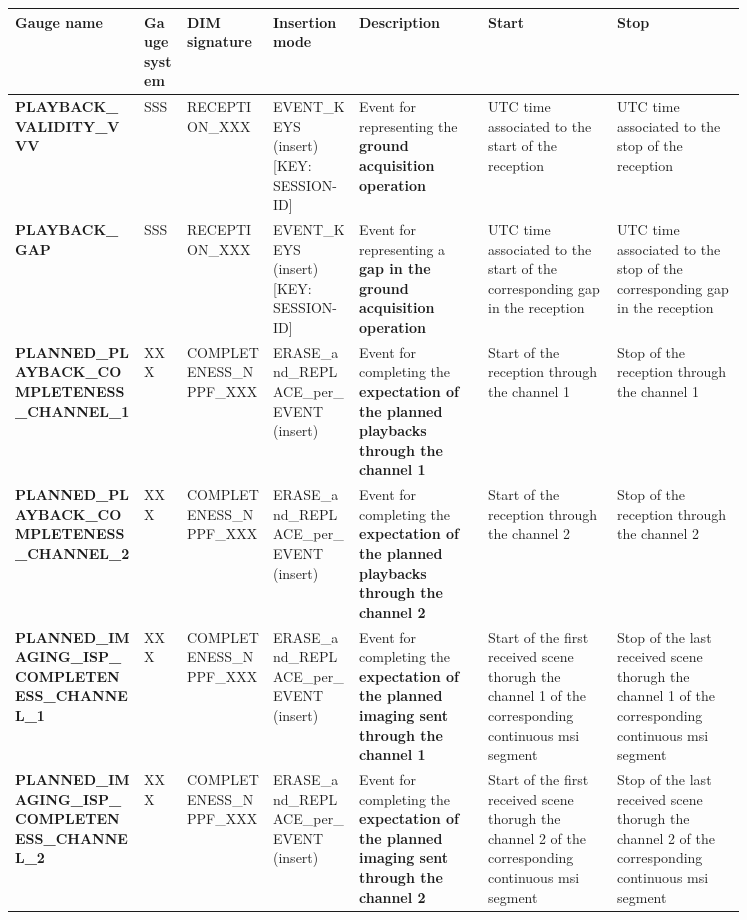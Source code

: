 \begin{landscape}
\begin{longtable}{|M{0.15\linewidth}|M{0.05\linewidth}|M{0.10\linewidth}|M{0.10\linewidth}|M{0.15\linewidth}|M{0.15\linewidth}|M{0.15\linewidth}|}
\hline \textbf{Gauge name} & \textbf{Gauge system} & \textbf{DIM signature} & \textbf{Insertion mode} & \textbf{Description} & \textbf{Start} & \textbf{Stop} \\ \hline
\textbf{PLAYBACK\_VALIDITY\_VVV} & SSS & \- RECEPTION\_XXX & EVENT\_KEYS (insert) [KEY: SESSION-ID] & Event for representing the \textbf{ground acquisition operation} & UTC time associated to the start of the reception & UTC time associated to the stop of the reception \\ \hline
\textbf{PLAYBACK\_GAP} & SSS & \- RECEPTION\_XXX & EVENT\_KEYS (insert) [KEY: SESSION-ID] & Event for representing a \textbf{gap in the ground acquisition operation} & UTC time associated to the start of the corresponding gap in the reception & UTC time associated to the stop of the corresponding gap in the reception \\ \hline
\textbf{PLANNED\_PLAYBACK\_COMPLETENESS\_CHANNEL\_1} & XXX & \- COMPLETENESS\_NPPF\_XXX & ERASE\_and\_REPLACE\_per\_EVENT (insert) & Event for completing the \textbf{expectation of the planned playbacks through the channel 1} & Start of the reception through the channel 1 & Stop of the reception through the channel 1 \\ \hline
\textbf{PLANNED\_PLAYBACK\_COMPLETENESS\_CHANNEL\_2} & XXX & \- COMPLETENESS\_NPPF\_XXX & ERASE\_and\_REPLACE\_per\_EVENT (insert) & Event for completing the \textbf{expectation of the planned playbacks through the channel 2} & Start of the reception through the channel 2 & Stop of the reception through the channel 2 \\ \hline
\textbf{PLANNED\_IMAGING\_ISP\_COMPLETENESS\_CHANNEL\_1} & XXX & \- COMPLETENESS\_NPPF\_XXX & ERASE\_and\_REPLACE\_per\_EVENT (insert) & Event for completing the \textbf{expectation of the planned imaging sent through the channel 1} & Start of the first received scene thorugh the channel 1 of the corresponding continuous \acrshort{msi} segment & Stop of the last received scene thorugh the channel 1 of the corresponding continuous \acrshort{msi} segment \\ \hline
\textbf{PLANNED\_IMAGING\_ISP\_COMPLETENESS\_CHANNEL\_2} & XXX & \- COMPLETENESS\_NPPF\_XXX & ERASE\_and\_REPLACE\_per\_EVENT (insert) & Event for completing the \textbf{expectation of the planned imaging sent through the channel 2} & Start of the first received scene thorugh the channel 2 of the corresponding continuous \acrshort{msi} segment & Stop of the last received scene thorugh the channel 2 of the corresponding continuous \acrshort{msi} segment \\ \hline

\end{longtable}
\end{landscape}
